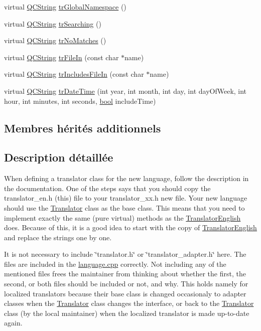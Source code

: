 \begin{DoxyCompactItemize}
\item 
virtual \hyperlink{class_q_c_string}{Q\+C\+String} \hyperlink{class_translator_turkish_ad39723d98618b6290087ca4a2f9fac6d}{tr\+Global\+Namespace} ()
\item 
virtual \hyperlink{class_q_c_string}{Q\+C\+String} \hyperlink{class_translator_turkish_ae899bb675e3b8f4a53cefc32b9138575}{tr\+Searching} ()
\item 
virtual \hyperlink{class_q_c_string}{Q\+C\+String} \hyperlink{class_translator_turkish_a4c731a9c91e85d6f7a9c1381303c870f}{tr\+No\+Matches} ()
\item 
virtual \hyperlink{class_q_c_string}{Q\+C\+String} \hyperlink{class_translator_turkish_add0665e9dea47ca2d5a99afc4b9da1af}{tr\+File\+In} (const char $\ast$name)
\item 
virtual \hyperlink{class_q_c_string}{Q\+C\+String} \hyperlink{class_translator_turkish_a863e8639af2855d5c9aed573d4ecfa79}{tr\+Includes\+File\+In} (const char $\ast$name)
\item 
virtual \hyperlink{class_q_c_string}{Q\+C\+String} \hyperlink{class_translator_turkish_a5d517565cb0e2aa4dfc9d070f0788776}{tr\+Date\+Time} (int year, int month, int day, int day\+Of\+Week, int hour, int minutes, int seconds, \hyperlink{qglobal_8h_a1062901a7428fdd9c7f180f5e01ea056}{bool} include\+Time)
\end{DoxyCompactItemize}
\subsection*{Membres hérités additionnels}


\subsection{Description détaillée}
When defining a translator class for the new language, follow the description in the documentation. One of the steps says that you should copy the translator\+\_\+en.\+h (this) file to your translator\+\_\+xx.\+h new file. Your new language should use the \hyperlink{class_translator}{Translator} class as the base class. This means that you need to implement exactly the same (pure virtual) methods as the \hyperlink{class_translator_english}{Translator\+English} does. Because of this, it is a good idea to start with the copy of \hyperlink{class_translator_english}{Translator\+English} and replace the strings one by one.

It is not necessary to include \char`\"{}translator.\+h\char`\"{} or \char`\"{}translator\+\_\+adapter.\+h\char`\"{} here. The files are included in the \hyperlink{language_8cpp}{language.\+cpp} correctly. Not including any of the mentioned files frees the maintainer from thinking about whether the first, the second, or both files should be included or not, and why. This holds namely for localized translators because their base class is changed occasionaly to adapter classes when the \hyperlink{class_translator}{Translator} class changes the interface, or back to the \hyperlink{class_translator}{Translator} class (by the local maintainer) when the localized translator is made up-\/to-\/date again. 

